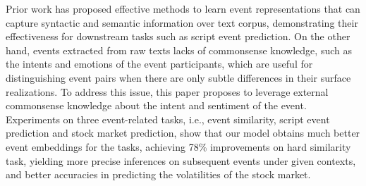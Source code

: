 Prior work has proposed effective methods to learn event representations that can capture syntactic and semantic information over text corpus, demonstrating their effectiveness for downstream tasks such as script event prediction. On the other hand, events extracted from raw texts lacks of commonsense knowledge, such as the intents and emotions of the event participants, which are useful for distinguishing event pairs when there are only subtle differences in their surface realizations. To address this issue, this paper proposes to leverage external commonsense knowledge about the intent and sentiment of the event. Experiments on three event-related tasks, i.e., event similarity, script event prediction and stock market prediction, show that our model obtains much better event embeddings for the tasks, achieving 78\% improvements on hard similarity task, yielding more precise inferences on subsequent events under given contexts, and better accuracies in predicting the volatilities of the stock market.